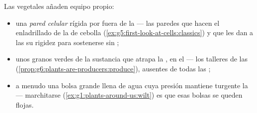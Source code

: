 \begin{proposition}\label{prop:g6:cell-unit-of-life:plantextras}
Las  vegetales añaden equipo propio:
\begin{itemize}
  \item una \emph{pared celular} rígida por fuera
        de la  --- las paredes que hacen el enladrillado de la
         de cebolla (\cref{ex:g5:first-look-at-cells:classics}) y
        que les dan a las  su rigidez para sostenerse sin
        ;
  \item unos granos verdes de la sustancia que atrapa la , en el
         --- los talleres de las 
        (\cref{prop:g6:plants-are-producers:produce}), ausentes de
        todas las  ;
  \item a menudo una bolsa grande llena de agua cuya presión mantiene
        turgente la  --- marchitarse
        (\cref{ex:g1:plants-around-us:wilt}) es que esas bolsas se
        queden flojas.
\end{itemize}
\end{proposition}
\admitted

